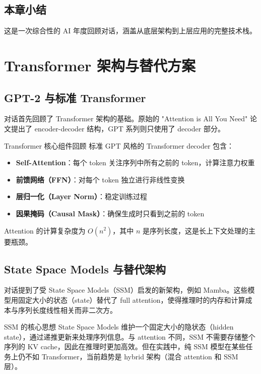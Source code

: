 \documentclass[a4paper]{article}
\begin{document}
\subsection{本章小结}

这是一次综合性的 AI 年度回顾对话，涵盖从底层架构到上层应用的完整技术栈。

\section{Transformer 架构与替代方案}

\subsection{GPT-2 与标准 Transformer}

对话首先回顾了 Transformer 架构的基础。原始的 "Attention is All You Need" 论文提出了 encoder-decoder 结构，GPT 系列则只使用了 decoder 部分。

\begin{importantbox}{Transformer 核心组件回顾}
标准 GPT 风格的 Transformer decoder 包含：
\begin{itemize}
    \item \textbf{Self-Attention}：每个 token 关注序列中所有之前的 token，计算注意力权重
    \item \textbf{前馈网络（FFN）}：对每个 token 独立进行非线性变换
    \item \textbf{层归一化（Layer Norm）}：稳定训练过程
    \item \textbf{因果掩码（Causal Mask）}：确保生成时只看到之前的 token
\end{itemize}
Attention 的计算复杂度为 $O(n^2)$，其中 $n$ 是序列长度，这是长上下文处理的主要瓶颈。
\end{importantbox}

\subsection{State Space Models 与替代架构}

对话提到了受 State Space Models（SSM）启发的新架构，例如 Mamba。这些模型用固定大小的状态（state）替代了 full attention，使得推理时的内存和计算成本与序列长度线性相关而非二次方。

\begin{knowledgebox}{SSM 的核心思想}
State Space Models 维护一个固定大小的隐状态（hidden state），通过递推更新来处理序列信息。与 attention 不同，SSM 不需要存储整个序列的 KV cache，因此在推理时更加高效。但在实践中，纯 SSM 模型在某些任务上仍不如 Transformer，当前趋势是 hybrid 架构（混合 attention 和 SSM 层）。
\end{knowledgebox}
\end{document}
